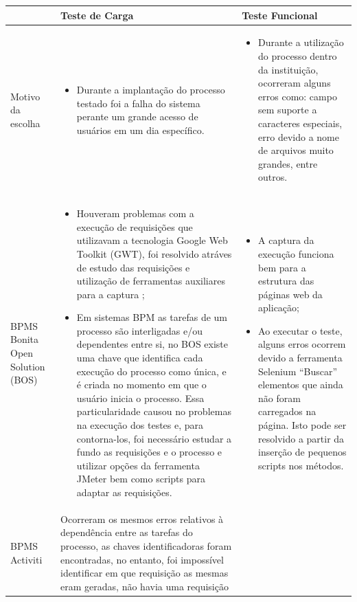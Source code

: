 \documentclass[12pt]{article}
\begin{document}
\begin{table}
{\scriptsize
\centering
\begin{tabular}{|p{2cm}|p{7cm}|p{7cm}|}
  & Teste de Carga & Teste Funcional  \\\hline
Motivo da escolha & 
\begin{itemize}
\item{Durante a implantação do processo testado foi a falha do sistema perante um grande acesso de usuários em um dia específico.}
\end{itemize}
&
\begin{itemize}
\item{Durante a utilização do processo
dentro da instituição, ocorreram alguns erros como: campo sem suporte a caracteres especiais,
erro devido a nome de arquivos muito grandes, entre outros.}
\end{itemize}
 \\\hline
BPMS Bonita Open Solution (BOS) & \begin{itemize}\item{Houveram problemas com a execução de requisições que utilizavam a tecnologia Google Web Toolkit (GWT), foi resolvido atráves de estudo das requisições e utilização de ferramentas auxiliares para a captura \cite{BLAZEMETER};}
\item{Em sistemas BPM as tarefas de um processo são interligadas e/ou dependentes entre si, no BOS existe uma chave que identifica cada execução do processo como única, e é criada no momento em que o usuário inicia o processo. Essa particularidade causou no problemas na execução dos testes e, para contorna-los, foi necessário estudar a fundo as requisições e o processo e utilizar opções da ferramenta JMeter bem como scripts para adaptar as requisições.}\end{itemize}
 & \begin{itemize} 
\item{A captura da execução funciona bem para a estrutura das páginas web da aplicação;}
\item{Ao executar o teste, alguns erros ocorrem devido a ferramenta Selenium “Buscar” elementos que ainda não foram carregados na página. Isto pode ser resolvido a partir da inserção de pequenos scripts nos métodos.}
 \end{itemize} \\\hline
BPMS Activiti & Ocorreram os mesmos erros relativos à dependência entre as tarefas do processo, as chaves identificadoras foram encontradas, no entanto, foi impossível identificar em que requisição as mesmas eram geradas, não havia uma requisição

\end{tabular}}
\end{table}
\end{document}
